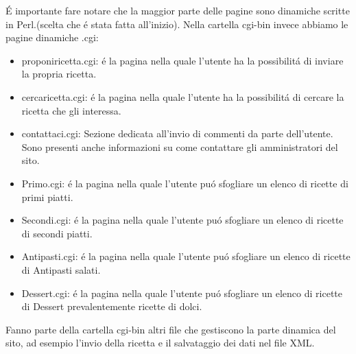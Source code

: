 \documentclass[12pt]{article}
\begin{document}
\begin{itemize}
				\'E importante fare notare che la maggior parte delle pagine sono dinamiche scritte in Perl.(scelta che \'e stata fatta all'inizio).
				Nella cartella cgi-bin invece abbiamo le pagine dinamiche .cgi:
				\begin{itemize} \item proponiricetta.cgi: \'e la pagina nella quale l'utente ha la possibilit\'a di inviare la propria ricetta.
				\end{itemize}
				\begin{itemize} \item cercaricetta.cgi: \'e la pagina nella quale l'utente ha la possibilit\'a di cercare la ricetta che gli interessa.
				\end{itemize}
				\begin{itemize} \item contattaci.cgi: Sezione dedicata all'invio di commenti da parte dell'utente. Sono presenti anche informazioni su come contattare gli amministratori del sito.
				\end{itemize}
				\begin{itemize} \item Primo.cgi: \'e la pagina nella quale l'utente pu\'o sfogliare un elenco di ricette di primi piatti.
				\end{itemize}
				\begin{itemize} \item Secondi.cgi: \'e la pagina nella quale l'utente pu\'o sfogliare un elenco di ricette di secondi piatti.
				\end{itemize}
				\begin{itemize} \item Antipasti.cgi: \'e la pagina nella quale l'utente pu\'o sfogliare un elenco di ricette di Antipasti salati.
				\end{itemize}
				\begin{itemize} \item Dessert.cgi: \'e la pagina nella quale l'utente pu\'o sfogliare un elenco di ricette di Dessert prevalentemente ricette di dolci.
				\end{itemize}
				Fanno parte della cartella cgi-bin altri file che gestiscono la parte dinamica del sito, ad esempio l'invio della ricetta e il salvataggio dei dati nel file XML.
				
			\end{itemize}
			
\end{document}
